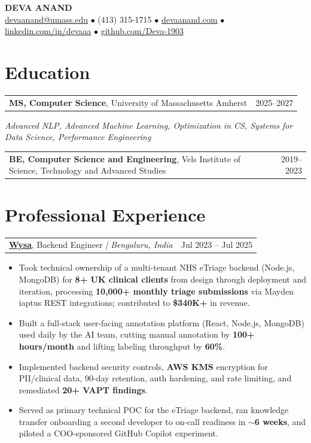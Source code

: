 \documentclass[letterpaper,11pt]{article}
\makeatletter
\newcommand{\eduItem}[3]{%
  \begin{tabular*}{\textwidth}{@{}l@{\extracolsep{\fill}}r@{}}
    \textbf{#1}, #2 & #3 \\
  \end{tabular*}\par
}
\newcommand{\expItem}[4]{%
  \vspace{3pt}
  \begin{tabular*}{\textwidth}{@{}l@{\extracolsep{\fill}}r@{}}
    \textbf{#1}, #2 \textit{| #3} & #4 \\
  \end{tabular*}\par\vspace{-2pt}
}
\makeatother
\begin{document}
\begin{center}
    {\fontsize{18}{20}\selectfont\bfseries DEVA ANAND}\\ \vspace{3pt}
    {\small
    \href{mailto:devaanand@umass.edu}{devaanand@umass.edu}
    \enspace$\bullet$\enspace
    (413) 315-1715
    \enspace$\bullet$\enspace
    \href{https://devaanand.com}{devaanand.com}
    \enspace$\bullet$\enspace
    \href{https://linkedin.com/in/devaaa/}{linkedin.com/in/devaaa}
    \enspace$\bullet$\enspace
    \href{https://github.com/Deva-1903}{github.com/Deva-1903}}
\end{center}
\vspace{-6pt}

\section{Education}
\eduItem{MS, Computer Science}{University of Massachusetts Amherst}{2025--2027}
{\small\textit{Advanced NLP, Advanced Machine Learning, Optimization in CS, Systems for Data Science, Performance Engineering}}\par
\vspace{3pt}
\eduItem{BE, Computer Science and Engineering}{Vels Institute of Science, Technology and Advanced Studies}{2019--2023}

\section{Professional Experience}

\expItem{\href{https://www.wysa.io}{Wysa}}{Backend Engineer}{Bengaluru, India}{Jul 2023 -- Jul 2025}
\begin{itemize}
  \item Took technical ownership of a multi-tenant NHS eTriage backend (Node.js, MongoDB) for \textbf{8+ UK clinical clients} from design through deployment and iteration, processing \textbf{10{,}000+ monthly triage submissions} via Mayden iaptus REST integrations; contributed to \textbf{\$340K+} in revenue.
  \item Built a full-stack user-facing annotation platform (React, Node.js, MongoDB) used daily by the AI team, cutting manual annotation by \textbf{100+ hours/month} and lifting labeling throughput by \textbf{60\%}.
  \item Implemented backend security controls, \textbf{AWS KMS} encryption for PII/clinical data, 90-day retention, auth hardening, and rate limiting, and remediated \textbf{20+ VAPT findings}.
  \item Served as primary technical POC for the eTriage backend, ran knowledge transfer onboarding a second developer to on-call readiness in \textbf{$\sim$6 weeks}, and piloted a COO-sponsored GitHub Copilot experiment.
\end{itemize}
\end{document}
